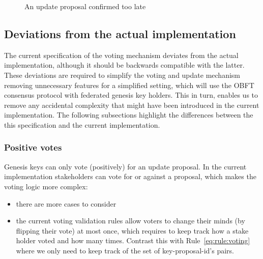 \begin{figure}[htb]
  \caption{An update proposal confirmed too late}
  \label{fig:up-confirmed-too-late}
\end{figure}

\clearpage

\subsection{Deviations from the actual implementation}
\label{sec:deviation-actual-impl}

The current specification of the voting mechanism deviates from the actual
implementation, although it should be backwards compatible with the latter.
These deviations are required to simplify the voting and update mechanism
removing unnecessary features for a simplified setting, which will use the OBFT
consensus protocol with federated genesis key holders. This in turn, enables us
to remove any accidental complexity that might have been introduced in the
current implementation. The following subsections highlight the differences
between the this specification and the current implementation.

\subsubsection{Positive votes}
\label{sec:only-positive-votes}

Genesis keys can only vote (positively) for an update proposal. In the current
implementation stakeholders can vote for or against a proposal, which makes the
voting logic more complex:
\begin{itemize}
\item there are more cases to consider
\item the current voting validation rules allow voters to change their minds
  (by flipping their vote) at most once, which requires to keep track how a
  stake holder voted and how many times. Contrast this with
  Rule~\ref{eq:rule:voting} where we only need to keep track of the set of
  key-proposal-id's pairs.
\end{itemize}

